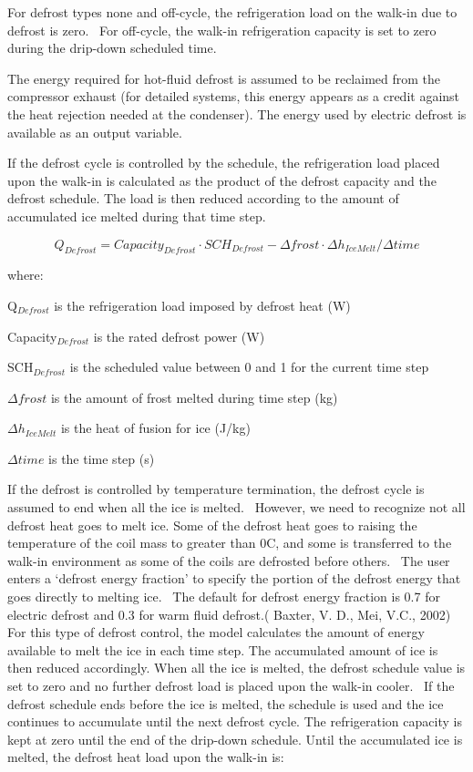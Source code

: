 For defrost types none and off-cycle, the refrigeration load on the walk-in due to defrost is zero.~ For off-cycle, the walk-in refrigeration capacity is set to zero during the drip-down scheduled time.

The energy required for hot-fluid defrost is assumed to be reclaimed from the compressor exhaust (for detailed systems, this energy appears as a credit against the heat rejection needed at the condenser). The energy used by electric defrost is available as an output variable.

If the defrost cycle is controlled by the schedule, the refrigeration load placed upon the walk-in is calculated as the product of the defrost capacity and the defrost schedule. The load is then reduced according to the amount of accumulated ice melted during that time step.

\begin{equation}
Q_{Defrost} = Capacity_{Defrost} \cdot SCH_{Defrost} - \Delta frost \cdot \Delta h_{IceMelt} / \Delta time
\end{equation}

where:

Q\(_{Defrost}\) is the refrigeration load imposed by defrost heat (W)

Capacity\(_{Defrost}\) is the rated defrost power (W)

SCH\(_{Defrost}\) is the scheduled value between 0 and 1 for the current time step

\(\Delta frost\) is the amount of frost melted during time step (kg)

\(\Delta h_{IceMelt}\) is the heat of fusion for ice (J/kg)

\(\Delta time\) is the time step (s)

If the defrost is controlled by temperature termination, the defrost cycle is assumed to end when all the ice is melted.~ However, we need to recognize not all defrost heat goes to melt ice. Some of the defrost heat goes to raising the temperature of the coil mass to greater than 0C, and some is transferred to the walk-in environment as some of the coils are defrosted before others.~ The user enters a `defrost energy fraction' to specify the portion of the defrost energy that goes directly to melting ice.~ The default for defrost energy fraction is 0.7 for electric defrost and 0.3 for warm fluid defrost.( Baxter, V. D., Mei, V.C., 2002) For this type of defrost control, the model calculates the amount of energy available to melt the ice in each time step. The accumulated amount of ice is then reduced accordingly. When all the ice is melted, the defrost schedule value is set to zero and no further defrost load is placed upon the walk-in cooler.~ If the defrost schedule ends before the ice is melted, the schedule is used and the ice continues to accumulate until the next defrost cycle. The refrigeration capacity is kept at zero until the end of the drip-down schedule. Until the accumulated ice is melted, the defrost heat load upon the walk-in is:

